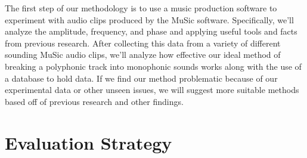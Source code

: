 \documentclass[11pt]{article}
\begin{document}

The first step of our methodology is to use a music production software to experiment with audio clips produced by the MuSic software. Specifically, we'll analyze the amplitude, frequency, and phase and applying useful tools and facts from previous research. After collecting this data from a variety of different sounding MuSic audio clips, we’ll analyze how effective our ideal method of breaking a polyphonic track into monophonic sounds works along with the use of a database to hold data. If we find our method problematic because of our experimental data or other unseen issues, we will suggest more suitable methods based off of previous research and other findings.

\vspace*{-.2in}
\section{Evaluation Strategy}
\label{sec:evaluate}
\vspace*{-.1in}

\end{document}
